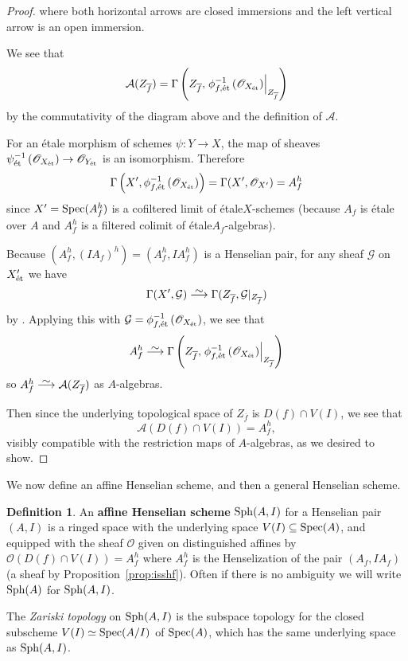 \documentclass[12pt]{article}
\newcommand\simto{\stackrel{\textstyle\sim}{\smash{\longrightarrow}\rule{0pt}{0.4ex}}}
\renewcommand{\O}{\mathscr{O}}
\newcommand{\spec}{{\rm Spec}}
\newcommand{\sph}{{\rm Sph}}
\newcommand{\ol}[1]{\overline{#1}}
\newcommand{\mc}[1]{\mathcal{#1}}
\newcommand{\Et}{\'etale\xspace}
\newcommand{\et}{{\rm\acute{e}t}}
\newcommand{\spcite}[2]{\cite[\href{https://stacks.math.columbia.edu/tag/#1}{{#2} {#1}}]{stackp}}
\theoremstyle{definition}
\newtheorem{definition}[theorem]{Definition}
\numberwithin{equation}{subsection}
\begin{document}
\begin{proof}
where both horizontal arrows are closed immersions and the left vertical arrow is an open immersion. 

We see that $$\mc{A}(Z_{\ol{f}})=\Gamma\left(Z_{\ol{f}},\left.\phi_{f,\et}^{-1}\left(\O_{X_{\et}}\right)\right|_{Z_{\ol{f}}}\right)$$ by the commutativity of the diagram above and the definition of $\mc{A}$.



For an \Et morphism of schemes $\psi: Y \to X$, the map of sheaves $\psi^{-1}_{\et}\left(\O_{X_{\et}}\right) \to \O_{Y_{\et}}$ is an isomorphism. Therefore $$\Gamma\left(X',\phi_{f,\et}^{-1}\left(\O_{X_{\et}}\right)\right)= \Gamma(X',\O_{X'})=A_f^h$$ since $X'=\spec(A_f^h)$ is a cofiltered limit of \Et $X$-schemes (because $A_f$ is \Et over $A$ and $A_f^h$ is a filtered colimit of \Et $A_f$-algebras). 

Because $(A_f^h,(IA_f)^h)=(A_f^h,IA_f^h)$ is a Henselian pair, for any sheaf $\mc{G}$ on $X'_{\et}$ we have $$\Gamma(X',\mc{G})\simto\Gamma(Z_{\ol{f}},\mc{G}|_{Z_{\ol{f}}})$$ by \spcite{09ZH}{Lemma}. Applying this with $\mc{G}=\phi_{f,\et}^{-1}\left(\O_{X_{\et}}\right)$, we see that $$A_f^h \simto \Gamma\left(Z_{\ol{f}},\left.\phi_{f,\et}^{-1}\left(\O_{X_{\et}}\right)\right|_{Z_{\ol{f}}}\right)$$ so $A_f^h \simto \mc{A}(Z_{\ol{f}})$ as $A$-algebras.

Then since the underlying topological space of $Z_{\ol{f}}$ is $D(f) \cap V(I)$, we see that $$\mc{A}(D(f) \cap V(I)) =A_f^h,$$ visibly compatible with the restriction maps of $A$-algebras, as we desired to show. \end{proof}
 

We now define an affine Henselian scheme, and then a general Henselian scheme.

\begin{definition}\label{def:affhenssch} 
An {\bf affine Henselian scheme} $\sph(A,I)$ for a Henselian pair $(A,I)$ is a ringed space with the underlying space $V(I) \subseteq \spec(A)$, and equipped with the sheaf $\O$ given on distinguished affines by $\O(D(f) \cap V(I)) =A_f^h$ where $A_f^h$ is the Henselization of the pair $(A_f,IA_f)$ (a sheaf by Proposition~\ref{prop:isshf}). Often if there is no ambiguity we will write $\sph(A)$ for $\sph(A,I)$.

The {\it Zariski topology} on $\sph(A,I)$ is the subspace topology for the closed subscheme $V(I) \simeq \spec(A/I)$ of $\spec(A)$, which has the same underlying space as $\sph(A,I)$. 
\end{definition}
\end{document}
